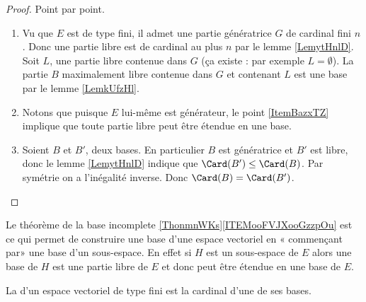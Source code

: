\begin{proof}
    Point par point.
    \begin{enumerate}
        \item
    Vu que \( E\) est de type fini, il admet une partie génératrice \( G\) de cardinal fini \( n\). Donc une partie libre est de cardinal au plus \( n\) par le lemme \ref{LemytHnlD}. Soit \( L\), une partie libre contenue dans \( G\) (ça existe : par exemple \( L=\emptyset\)). La partie \( B\) maximalement libre contenue dans \( G\) et contenant \( L\) est une base par le lemme \ref{LemkUfzHl}.
\item
Notons que puisque \( E\) lui-même est générateur, le point \ref{ItemBazxTZ} implique que toute partie libre peut être étendue en une base.
\item
    Soient \( B\) et \( B'\), deux bases. En particulier \( B\) est génératrice et \( B'\) est libre, donc le lemme \ref{LemytHnlD} indique que \( \Card(B')\leq \Card(B)\). Par symétrie on a l'inégalité inverse. Donc \( \Card(B)=\Card(B')\).
    \end{enumerate}
\end{proof}

\begin{remark}      \label{REMooYGJEooEcZQKa}
    Le théorème de la base incomplete \ref{ThonmnWKs}\ref{ITEMooFVJXooGzzpOu} est ce qui permet de construire une base d'une espace vectoriel en « commençant par» une base d'un sous-espace. En effet si \( H\) est un sous-espace de \( E\) alors une base de \( H\) est une partie libre de \( E\) et donc peut être étendue en une base de \( E\).
\end{remark}

\begin{definition}
    La  d'un espace vectoriel de type fini est la cardinal d'une de ses bases.
\end{definition}

